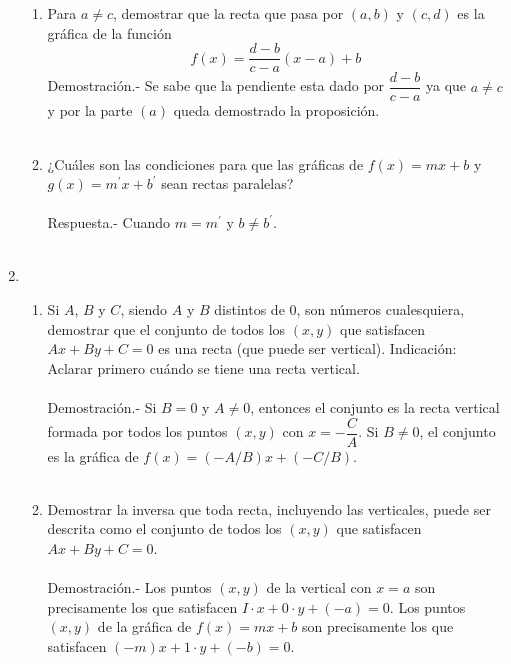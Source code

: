 \begin{enumerate}[\bfseries 1.]
\begin{enumerate}[\bfseries (a)]
	\item Para $a\neq c$, demostrar que la recta que pasa por $(a,b)$ y $(c,d)$ es la gráfica de la función $$f(x)=\dfrac{d-b}{c-a}(x-a)+b$$
	    Demostración.-\; Se sabe que la pendiente esta dado por $\dfrac{d-b}{c-a}$  ya que $a\neq c$ y por la parte $(a)$ queda demostrado la proposición.\\\\
	
	\item ¿Cuáles son las condiciones para que las gráficas de $f(x)=mx+b$ y $g(x)=m^{'} x + b^{'}$ sean rectas paralelas?\\\\
	    Respuesta.-\; Cuando $m=m^{'}$ y $b\neq b^{'}$.\\\\

    \end{enumerate}

    \item 
    \begin{enumerate}[\bfseries (a)]

	\item Si $A$, $B$ y $C$, siendo $A$ y $B$ distintos de $0$, son números cualesquiera, demostrar que el conjunto de todos los $(x,y)$ que satisfacen $Ax+By+C=0$ es una recta (que puede ser vertical). Indicación: Aclarar primero cuándo se tiene una recta vertical.\\\\
	    Demostración.-\; Si $B=0$ y $A\neq 0$, entonces el conjunto es la recta vertical formada por todos los puntos $(x,y)$ con $x=-\dfrac{C}{A}$. Si $B\neq 0$, el conjunto es la gráfica de $f(x)=(-A/B)x + (-C/B)$.\\\\ 

	\item Demostrar la inversa que toda recta, incluyendo las verticales, puede ser descrita como el conjunto de todos los $(x,y)$ que satisfacen $Ax + By + C =0$.\\\\
	    Demostración.-\; Los puntos $(x,y)$ de la vertical con $x=a$ son precisamente los que satisfacen $I\cdot x + 0\cdot y + (-a) = 0$. Los puntos $(x,y)$ de la gráfica de $f(x)=mx+b$ son precisamente los que satisfacen $(-m)x + 1\cdot y + (-b)=0$.\\\\
    \end{enumerate}


\end{enumerate}
